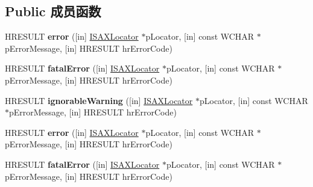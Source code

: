 \subsection*{Public 成员函数}
\begin{DoxyCompactItemize}
\item 
\mbox{\label{interface_m_s_x_m_l2_1_1_i_s_a_x_error_handler_aed1d56c534fcf5c2f83de7340b964334}} 
H\+R\+E\+S\+U\+LT {\bfseries error} (\mbox{[}in\mbox{]} \hyperlink{interface_m_s_x_m_l2_1_1_i_s_a_x_locator}{I\+S\+A\+X\+Locator} $\ast$p\+Locator, \mbox{[}in\mbox{]} const W\+C\+H\+AR $\ast$p\+Error\+Message, \mbox{[}in\mbox{]} H\+R\+E\+S\+U\+LT hr\+Error\+Code)
\item 
\mbox{\label{interface_m_s_x_m_l2_1_1_i_s_a_x_error_handler_a92b3882a755ad3f0204edccb1d5bcb10}} 
H\+R\+E\+S\+U\+LT {\bfseries fatal\+Error} (\mbox{[}in\mbox{]} \hyperlink{interface_m_s_x_m_l2_1_1_i_s_a_x_locator}{I\+S\+A\+X\+Locator} $\ast$p\+Locator, \mbox{[}in\mbox{]} const W\+C\+H\+AR $\ast$p\+Error\+Message, \mbox{[}in\mbox{]} H\+R\+E\+S\+U\+LT hr\+Error\+Code)
\item 
\mbox{\label{interface_m_s_x_m_l2_1_1_i_s_a_x_error_handler_aae67c103a383521fbca128ce05def1a3}} 
H\+R\+E\+S\+U\+LT {\bfseries ignorable\+Warning} (\mbox{[}in\mbox{]} \hyperlink{interface_m_s_x_m_l2_1_1_i_s_a_x_locator}{I\+S\+A\+X\+Locator} $\ast$p\+Locator, \mbox{[}in\mbox{]} const W\+C\+H\+AR $\ast$p\+Error\+Message, \mbox{[}in\mbox{]} H\+R\+E\+S\+U\+LT hr\+Error\+Code)
\item 
\mbox{\label{interface_m_s_x_m_l2_1_1_i_s_a_x_error_handler_aed1d56c534fcf5c2f83de7340b964334}} 
H\+R\+E\+S\+U\+LT {\bfseries error} (\mbox{[}in\mbox{]} \hyperlink{interface_m_s_x_m_l2_1_1_i_s_a_x_locator}{I\+S\+A\+X\+Locator} $\ast$p\+Locator, \mbox{[}in\mbox{]} const W\+C\+H\+AR $\ast$p\+Error\+Message, \mbox{[}in\mbox{]} H\+R\+E\+S\+U\+LT hr\+Error\+Code)
\item 
\mbox{\label{interface_m_s_x_m_l2_1_1_i_s_a_x_error_handler_a92b3882a755ad3f0204edccb1d5bcb10}} 
H\+R\+E\+S\+U\+LT {\bfseries fatal\+Error} (\mbox{[}in\mbox{]} \hyperlink{interface_m_s_x_m_l2_1_1_i_s_a_x_locator}{I\+S\+A\+X\+Locator} $\ast$p\+Locator, \mbox{[}in\mbox{]} const W\+C\+H\+AR $\ast$p\+Error\+Message, \mbox{[}in\mbox{]} H\+R\+E\+S\+U\+LT hr\+Error\+Code)

\end{DoxyCompactItemize}
